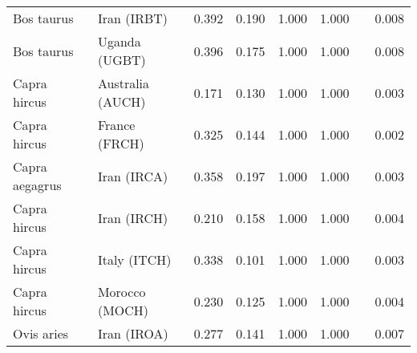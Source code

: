 \begin{center}
\begin{adjustbox}{width = 1\textwidth}
\begin{tabular}{|l|l|r|r|r|r|r|}
          Bos taurus &                     Iran (IRBT) &                                              0.392 &                                              0.190 &                1.000 &                                  1.000~~ &              0.008 \\
          Bos taurus &                   Uganda (UGBT) &                                              0.396 &                                              0.175 &                1.000 &                                  1.000~~ &              0.008 \\
        Capra hircus &                Australia (AUCH) &                                              0.171 &                                              0.130 &                1.000 &                                  1.000~~ &              0.003 \\
        Capra hircus &                   France (FRCH) &                                              0.325 &                                              0.144 &                1.000 &                                  1.000~~ &              0.002 \\
      Capra aegagrus &                     Iran (IRCA) &                                              0.358 &                                              0.197 &                1.000 &                                  1.000~~ &              0.003 \\
        Capra hircus &                     Iran (IRCH) &                                              0.210 &                                              0.158 &                1.000 &                                  1.000~~ &              0.004 \\
        Capra hircus &                    Italy (ITCH) &                                              0.338 &                                              0.101 &                1.000 &                                  1.000~~ &              0.003 \\
        Capra hircus &                  Morocco (MOCH) &                                              0.230 &                                              0.125 &                1.000 &                                  1.000~~ &              0.004 \\
          Ovis aries &                     Iran (IROA) &                                              0.277 &                                              0.141 &                1.000 &                                  1.000~~ &              0.007 \\

\end{tabular}
\end{adjustbox}
\end{center}
